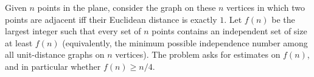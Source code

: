 Given $n$ points in the plane, consider the graph on these $n$ vertices in which two points are adjacent iff their Euclidean distance is exactly $1$.
Let $f(n)$ be the largest integer such that every set of $n$ points contains an independent set of size at least $f(n)$ (equivalently, the minimum possible independence number among all unit-distance graphs on $n$ vertices).
The problem asks for estimates on $f(n)$, and in particular whether $f(n)\ge n/4$.
